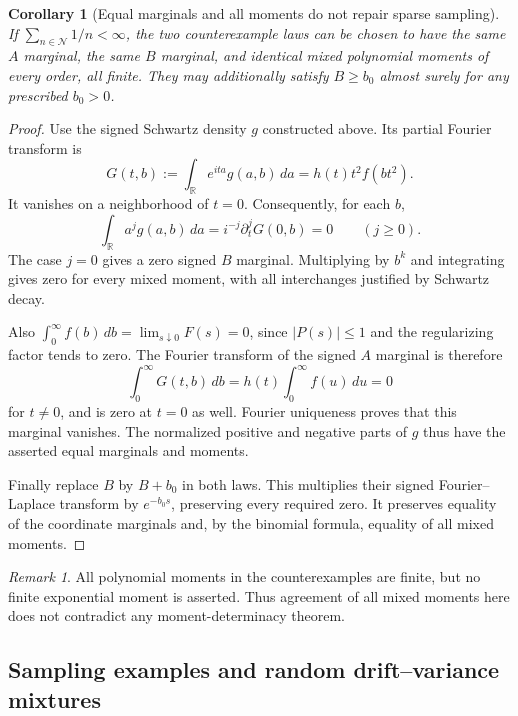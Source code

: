 \documentclass[11pt,letterpaper]{article}
\newtheorem{corollary}[theorem]{Corollary}
\theoremstyle{definition}
\theoremstyle{remark}
\newtheorem{remark}[theorem]{Remark}
\newcommand{\1}{\mathbf 1}
\begin{document}
\begin{corollary}[Equal marginals and all moments do not repair sparse sampling]
\label{p09:cor:same-moments}
If $\sum_{n\in\mathcal N}1/n<\infty$, the two counterexample laws can
be chosen to have the same $A$ marginal, the same $B$ marginal, and
identical mixed polynomial moments of every order, all finite.
They may additionally satisfy $B\ge b_0$ almost surely for any
prescribed $b_0>0$.
\end{corollary}
\begin{proof}
Use the signed Schwartz density $g$ constructed above. Its partial
Fourier transform is
\[
 G(t,b):=\int_{\mathbb R}e^{ita}g(a,b)\,da=h(t)t^2f(bt^2).
\]
It vanishes on a neighborhood of $t=0$. Consequently, for each $b$,
\[
 \int_{\mathbb R}a^j g(a,b)\,da=i^{-j}\partial_t^jG(0,b)=0
 \qquad(j\ge0).
\]
The case $j=0$ gives a zero signed $B$ marginal. Multiplying by
$b^k$ and integrating gives zero for every mixed moment, with all
interchanges justified by Schwartz decay.

Also $\int_0^\infty f(b)\,db=\lim_{s\downarrow0}F(s)=0$, since
$|P(s)|\le1$ and the regularizing factor tends to zero.
The Fourier transform of the signed $A$ marginal is therefore
\[
 \int_0^\infty G(t,b)\,db
 =h(t)\int_0^\infty f(u)\,du=0
\]
for $t\ne0$, and is zero at $t=0$ as well. Fourier uniqueness proves
that this marginal vanishes. The normalized positive and negative
parts of $g$ thus have the asserted equal marginals and moments.

Finally replace $B$ by $B+b_0$ in both laws. This multiplies their
signed Fourier--Laplace transform by $e^{-b_0s}$, preserving every
required zero. It preserves equality of the coordinate marginals
and, by the binomial formula, equality of all mixed moments.
\end{proof}

\begin{remark}
All polynomial moments in the counterexamples are finite, but no
finite exponential moment is asserted. Thus agreement of all mixed
moments here does not contradict any moment-determinacy theorem.
\end{remark}





\subsection{Sampling examples and random drift--variance mixtures}
\end{document}

